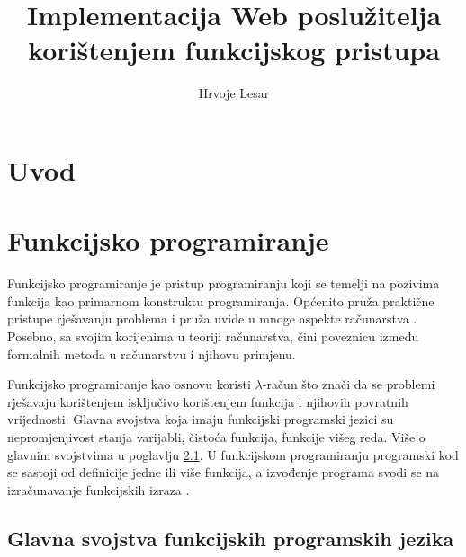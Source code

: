 \documentclass[]{foi} %
\title{Implementacija Web poslužitelja korištenjem funkcijskog pristupa}
\author{Hrvoje Lesar} %
\begin{document}
\maketitle

\tableofcontents

\makeatletter {} \makeatother
\pagestyle{plain}

\chapter{Uvod}

\chapter{Funkcijsko programiranje}

Funkcijsko programiranje je pristup programiranju koji se temelji na pozivima funkcija kao primarnom konstruktu programiranja.
Općenito pruža praktične pristupe rješavanju problema i pruža uvide u mnoge aspekte računarstva \cite{michaelson2011introduction}.
Posebno, sa svojim korijenima u teoriji računarstva, čini poveznicu između formalnih metoda u računarstvu i njihovu primjenu.

Funkcijsko programiranje kao osnovu koristi $\lambda$-račun što znači da se problemi rješavaju korištenjem
isključivo korištenjem funkcija i njihovih povratnih vrijednosti. Glavna svojstva koja imaju funkcijski
programski jezici su nepromjenjivost stanja varijabli, čistoća funkcija, funkcije višeg reda. Više o glavnim svojstvima
u poglavlju \ref{sec:svojstva}. U funkcijskom programiranju programski kod se sastoji od definicije jedne
ili više funkcija, a izvođenje programa svodi se na izračunavanje funkcijskih izraza \cite{rovzic2016lambda}.

\section{Glavna svojstva funkcijskih programskih jezika} \label{sec:svojstva}
\end{document}
